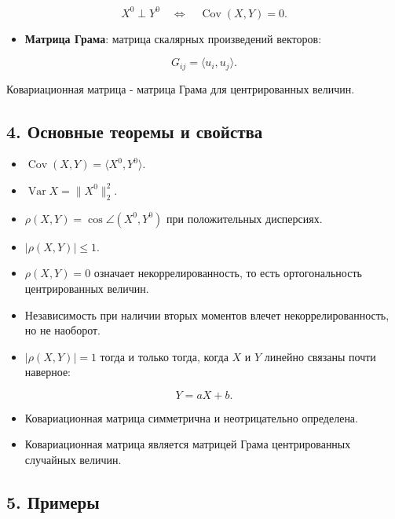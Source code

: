 \documentclass[
  11pt,
  a4paper,
]{article}
\providecommand{\tightlist}{%
  \setlength{\itemsep}{0pt}\setlength{\parskip}{0pt}}
\begin{document}
\[
X^0\perp Y^0
\quad\Longleftrightarrow\quad
\operatorname{Cov}(X,Y)=0.
\]

\begin{itemize}
\tightlist
\item
  \textbf{Матрица Грама}: матрица скалярных произведений векторов:
\end{itemize}

\[
G_{ij}=\langle u_i,u_j\rangle.
\]

Ковариационная матрица - матрица Грама для центрированных величин.

\subsection{4. Основные теоремы и
свойства}\label{ux43eux441ux43dux43eux432ux43dux44bux435-ux442ux435ux43eux440ux435ux43cux44b-ux438-ux441ux432ux43eux439ux441ux442ux432ux430}

\begin{itemize}
\tightlist
\item
  \(\operatorname{Cov}(X,Y)=\langle X^0,Y^0\rangle\).
\item
  \(\operatorname{Var}X=\|X^0\|_2^2\).
\item
  \(\rho(X,Y)=\cos\angle(X^0,Y^0)\) при положительных дисперсиях.
\item
  \(|\rho(X,Y)|\le1\).
\item
  \(\rho(X,Y)=0\) означает некоррелированность, то есть ортогональность
  центрированных величин.
\item
  Независимость при наличии вторых моментов влечет некоррелированность,
  но не наоборот.
\item
  \(|\rho(X,Y)|=1\) тогда и только тогда, когда \(X\) и \(Y\) линейно
  связаны почти наверное:
\end{itemize}

\[
Y=aX+b.
\]

\begin{itemize}
\tightlist
\item
  Ковариационная матрица симметрична и неотрицательно определена.
\item
  Ковариационная матрица является матрицей Грама центрированных
  случайных величин.
\end{itemize}

\subsection{5. Примеры}\label{ux43fux440ux438ux43cux435ux440ux44b}
\end{document}
